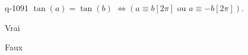 \begin{truefalse}{q-1091}
$\tan(a)=\tan(b)$  $\Leftrightarrow \left(a\equiv b [2\pi]\text{ ou } a\equiv -b [2\pi]\right)$.
\item Vrai
\item* Faux
\end{truefalse}

